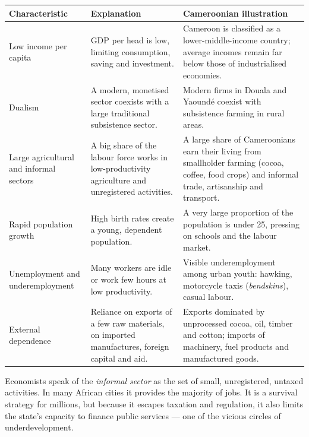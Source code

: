 \documentclass[11pt]{article}
\newcounter{popsec}
\newcounter{popsub}
\newcommand{\courssub}[1]{%
  \stepcounter{popsub}%
  \par\vspace{9pt}\noindent{\popxbold\fontsize{11.5}{13}\selectfont\color{popink}{\color{poporange}\thepopsec.\thepopsub}\hspace{6pt}#1}\par\nopagebreak\vspace{4pt}
}
\begin{document}
\begin{center}
\begin{tabularx}{\linewidth}{|l|X|X|}
\hline
\rowcolor{popblueL} \textbf{Characteristic} & \textbf{Explanation} & \textbf{Cameroonian illustration} \\
\hline
Low income per capita & GDP per head is low, limiting consumption, saving and investment. & Cameroon is classified as a lower-middle-income country; average incomes remain far below those of industrialised economies. \\
\hline
Dualism & A modern, monetised sector coexists with a large traditional subsistence sector. & Modern firms in Douala and Yaound\'e coexist with subsistence farming in rural areas. \\
\hline
Large agricultural and informal sectors & A big share of the labour force works in low-productivity agriculture and unregistered activities. & A large share of Cameroonians earn their living from smallholder farming (cocoa, coffee, food crops) and informal trade, artisanship and transport. \\
\hline
Rapid population growth & High birth rates create a young, dependent population. & A very large proportion of the population is under 25, pressing on schools and the labour market. \\
\hline
Unemployment and underemployment & Many workers are idle or work few hours at low productivity. & Visible underemployment among urban youth: hawking, motorcycle taxis (\emph{bendskins}), casual labour. \\
\hline
External dependence & Reliance on exports of a few raw materials, on imported manufactures, foreign capital and aid. & Exports dominated by unprocessed cocoa, oil, timber and cotton; imports of machinery, fuel products and manufactured goods. \\
\hline
\end{tabularx}
\end{center}

\begin{savaistu}
Economists speak of the \emph{informal sector} as the set of small, unregistered, untaxed activities. In many African cities it provides the majority of jobs. It is a survival strategy for millions, but because it escapes taxation and regulation, it also limits the state's capacity to finance public services — one of the vicious circles of underdevelopment.
\end{savaistu}

\courssub{Indicators of Development}
\end{document}
